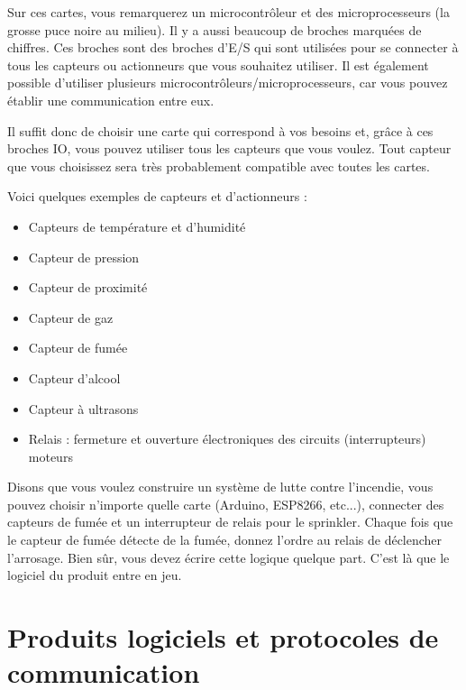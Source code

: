 \documentclass[12pt]{report}
\begin{document}
Sur ces cartes, vous remarquerez un microcontrôleur et des microprocesseurs (la grosse puce noire au milieu).
Il y a aussi beaucoup de broches marquées de chiffres. Ces broches sont des
broches d'E/S qui sont utilisées pour se connecter à tous les capteurs ou
actionneurs que vous souhaitez utiliser. Il est également possible d'utiliser plusieurs
microcontrôleurs/microprocesseurs, car vous pouvez établir une
communication entre eux.

Il suffit donc de choisir une carte qui correspond à vos besoins et,
grâce à ces broches IO, vous pouvez utiliser tous les capteurs que vous
voulez. Tout capteur que vous choisissez sera très probablement
compatible avec toutes les cartes.

Voici quelques exemples de capteurs et d'actionneurs :

\begin{itemize}
      \item
            Capteurs de température et d'humidité
      \item
            Capteur de pression
      \item
            Capteur de proximité
      \item
            Capteur de gaz
      \item
            Capteur de fumée
      \item
            Capteur d'alcool
      \item
            Capteur à ultrasons
      \item
            Relais : fermeture et ouverture électroniques des circuits
            (interrupteurs) moteurs
\end{itemize}

Disons que vous voulez construire un système de lutte contre l'incendie,
vous pouvez choisir n'importe quelle carte (Arduino, ESP8266, etc...),
connecter des capteurs de fumée et un interrupteur de relais pour le
sprinkler. Chaque fois que le capteur de fumée détecte de la fumée,
donnez l'ordre au relais de déclencher l'arrosage. Bien sûr, vous devez
écrire cette logique quelque part. C'est là que le logiciel du produit
entre en jeu.

\hypertarget{produits-logiciels-et-protocoles-de-communication}{%
      \chapter{\texorpdfstring{Produits logiciels et protocoles de
              communication
        }{Produits logiciels et protocoles de communication }}\label{produits-logiciels-et-protocoles-de-communication}}
\end{document}
